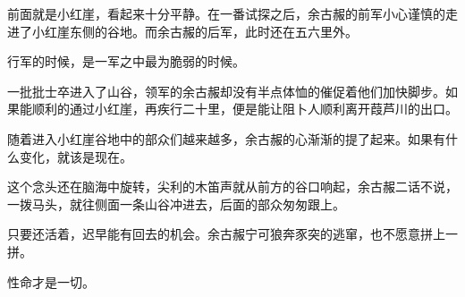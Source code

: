 前面就是小红崖，看起来十分平静。在一番试探之后，余古赧的前军小心谨慎的走进了小红崖东侧的谷地。而余古赧的后军，此时还在五六里外。

行军的时候，是一军之中最为脆弱的时候。

一批批士卒进入了山谷，领军的余古赧却没有半点体恤的催促着他们加快脚步。如果能顺利的通过小红崖，再疾行二十里，便是能让阻卜人顺利离开葭芦川的出口。

随着进入小红崖谷地中的部众们越来越多，余古赧的心渐渐的提了起来。如果有什么变化，就该是现在。

这个念头还在脑海中旋转，尖利的木笛声就从前方的谷口响起，余古赧二话不说，一拨马头，就往侧面一条山谷冲进去，后面的部众匆匆跟上。

只要还活着，迟早能有回去的机会。余古赧宁可狼奔豕突的逃窜，也不愿意拼上一拼。

性命才是一切。

